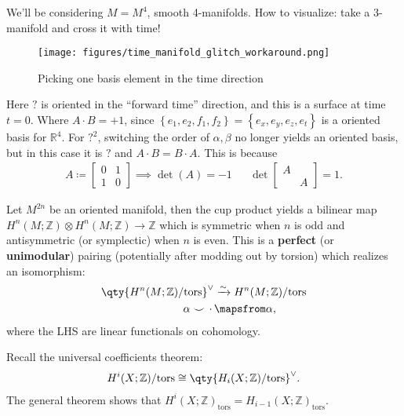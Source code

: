 \begin{remark}

We'll be considering \(M = M^4\), smooth 4-manifolds. How to visualize:
take a 3-manifold and cross it with time!

\begin{figure}
\centering
\texttt{[image: figures/time\_manifold\_glitch\_workaround.png]}
\caption{Picking one basis element in the time direction}
\end{figure}

Here \(?\) is oriented in the ``forward time'' direction, and this is a
surface at time \(t=0\). Where \(A\cdot B = +1\), since
\(\left\{{ e_1, e_2, f_1, f_2 }\right\} = \left\{{ e_x, e_y, e_z, e_t }\right\}\)
is a oriented basis for \({\mathbb{R}}^4\). For \(?^2\), switching the
order of \(\alpha, \beta\) no longer yields an oriented basis, but in
this case it is \(?\) and \(A\cdot B = B \cdot A\). This is because
\begin{align*}
A \coloneqq
\begin{bmatrix}
0 &  1
\\
1 & 0 
\end{bmatrix}
\implies \det(A)
=-1 &&
\det 
\begin{bmatrix}
A &  
\\
 & A 
\end{bmatrix}
 = 1
.\end{align*}

\end{remark}

\begin{remark}

Let \(M^{2n}\) be an oriented manifold, then the cup product yields a
bilinear map
\(H^n(M; {\mathbb{Z}}) \otimes H^n(M; {\mathbb{Z}}) \to {\mathbb{Z}}\)
which is symmetric when \(n\) is odd and antisymmetric (or symplectic)
when \(n\) is even. This is a \textbf{perfect} (or \textbf{unimodular})
pairing (potentially after modding out by torsion) which realizes an
isomorphism:
\begin{align*}
\qty{ H^n(M; {\mathbb{Z}})/{\operatorname{tors}}}^\vee&\xrightarrow{\sim} H^n(M; {\mathbb{Z}})/{\operatorname{tors}}\\
\alpha \smile{\,\cdot\,}&\mapsfrom \alpha
,\end{align*}
where the LHS are linear functionals on cohomology.

\end{remark}

\begin{remark}

Recall the universal coefficients theorem:
\begin{align*}
H^i(X; {\mathbb{Z}})/{\operatorname{tors}}\cong \qty{ H_i(X; {\mathbb{Z}})/{\operatorname{tors}}}^\vee
.\end{align*}
The general theorem shows that
\(H^i(X; {\mathbb{Z}})_{\operatorname{tors}}= H_{i-1}(X; {\mathbb{Z}})_{\operatorname{tors}}\).

\end{remark}

